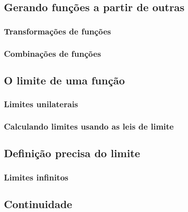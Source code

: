 \subsection{Gerando funções a partir de outras}
\subsubsection{Transformações de funções}
\subsubsection{Combinações de funções}

\subsection{O limite de uma função}

\subsubsection{Limites unilaterais}

\subsubsection{Calculando limites usando as leis de limite}

\subsection{Definição precisa do limite}
\subsubsection{Limites infinitos}
\subsection{Continuidade}

